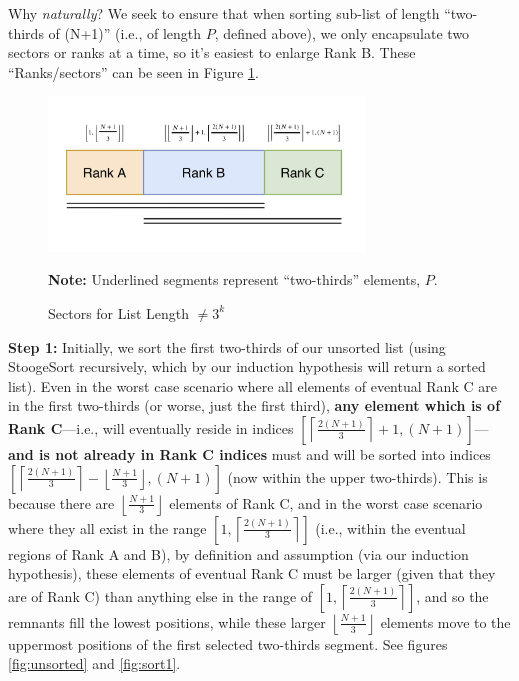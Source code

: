 \documentclass[conference]{styles/acmsiggraph}
\newcommand{\?}{\stackrel{?}{=}}
\begin{document}
Why \textit{naturally}?  We seek to ensure that when sorting sub-list of length \enquote{two-thirds of (N+1)} (i.e., of length $P$, defined above), we only encapsulate two sectors or ranks at a time, so it's easiest to enlarge Rank B.  These \enquote{Ranks/sectors} can be seen in Figure \ref{fig:notpower3}.

\begin{figure}[h]
    \centering
    \includegraphics[width=0.75\textwidth]{StoogeFigures/NotPower3.png}
    \caption{Sectors for List Length $\ne 3^k$}
    \textbf{Note:} Underlined segments represent \enquote{two-thirds} elements, $P$.
    \label{fig:notpower3}
\end{figure}
\FloatBarrier

\textbf{Step 1:} Initially, we sort the first two-thirds of our unsorted list (using StoogeSort recursively, which by our induction hypothesis will return a sorted list).  Even in the worst case scenario where all elements of eventual Rank C are in the first two-thirds (or worse, just the first third), \textbf{any element which is of Rank C}---i.e., will eventually reside in indices $\left [ \left \lceil \frac{2(N+1)}{3} \right \rceil +1, (N+1) \right]$---\textbf{and is not already in Rank C indices} must and will be sorted into indices $\left [ \left \lceil \frac{2(N+1)}{3} \right \rceil - \left \lfloor \frac{N+1}{3} \right \rfloor, (N+1) \right]$ (now within the upper two-thirds).  This is because there are $\left \lfloor \frac{N+1}{3}  \right \rfloor$ elements of Rank C, and in the worst case scenario where they all exist in the range $\left [ 1, \left \lceil \frac{2(N+1)}{3} \right \rceil \right ]$ (i.e., within the eventual regions of Rank A and B), by definition and assumption (via our induction hypothesis), these elements of eventual Rank C must be larger (given that they are of Rank C) than anything else in the range of $\left [ 1, \left \lceil \frac{2(N+1)}{3} \right \rceil \right ]$, and so the remnants fill the lowest positions, while these larger $\left \lfloor \frac{N+1}{3}  \right \rfloor$ elements move to the uppermost positions of the first selected two-thirds segment.  See figures \ref{fig:unsorted} and \ref{fig:sort1}. \\
\end{document}
